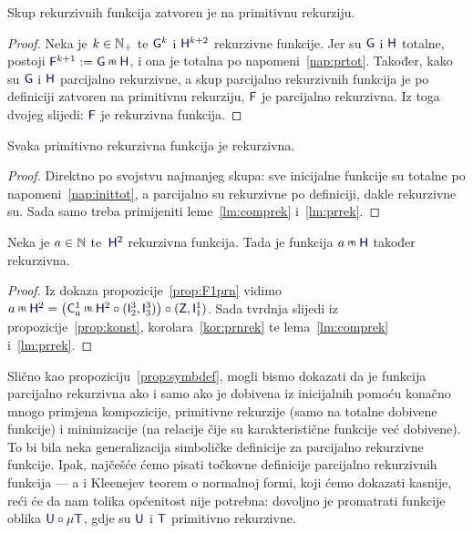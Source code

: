\begin{lema}[{name=[zatvorenost skupa rekurzivnih funkcija na primitivnu rekurziju]}]\label{lm:prrek}
Skup rekurzivnih funkcija zatvoren je na primitivnu rekurziju.
\end{lema}
\begin{proof}
    Neka je $k\in{\mathbb N}_+$ te $\f G^k$ i $\f H^{k+2}$ rekurzivne funkcije. Jer su $\f G$ i $\f H$ totalne, postoji $\f F^{k+1}:=\f G\pr\f H$, i ona je totalna po napomeni~\ref{nap:prtot}. Također, kako su $\f G$ i $\f H$ parcijalno rekurzivne, a skup parcijalno rekurzivnih funkcija je po definiciji zatvoren na primitivnu rekurziju, $\f F$ je parcijalno rekurzivna. Iz toga dvojeg slijedi: $\f F$ je rekurzivna funkcija.
\end{proof}

\begin{korolar}[{name=[rekurzivnost primitivno rekurzivnih funkcija]}]\label{kor:prnrek}
Svaka primitivno rekurzivna funkcija je rekurzivna.
\end{korolar}
\begin{proof}
Direktno po svojstvu najmanjeg skupa: sve inicijalne funkcije su totalne po napomeni~\ref{nap:inittot}, a parcijalno su rekurzivne po definiciji, dakle rekurzivne su. Sada samo treba primijeniti leme~\ref{lm:comprek} i~\ref{lm:prrek}.
\end{proof}

\begin{korolar}[{name=[degenerirana primitivna rekurzija iz rekurzivne funkcije]}]\label{kor:F1rek}
Neka je $a\in{\mathbb N}$ te\, $\f H^2$ rekurzivna funkcija. Tada je funkcija $a\pr\f H$ također rekurzivna.
\end{korolar}
\begin{proof}
Iz dokaza propozicije~\ref{prop:F1prn}
vidimo $a\pr\f H^2=\bigl(\f C_a^1\pr\f H^2\circ(\f I_2^3,\f I_3^3)\bigr)\circ(\f Z,\f I_1^1)$. Sada tvrdnja slijedi iz propozicije~\ref{prop:konst}, korolara~\ref{kor:prnrek} te lema~\ref{lm:comprek} i~\ref{lm:prrek}.
\end{proof}

Slično kao propoziciju~\ref{prop:symbdef}, mogli bismo dokazati da je funkcija parcijalno rekurzivna ako i samo ako je dobivena iz inicijalnih pomoću konačno mnogo primjena kompozicije, primitivne rekurzije (samo na totalne dobivene funkcije) i minimizacije (na relacije čije su karakteristične funkcije već dobivene). To bi bila neka generalizacija simboličke definicije za parcijalno rekurzivne funkcije. Ipak, najčešće ćemo pisati točkovne definicije parcijalno rekurzivnih funkcija --- a i Kleenejev teorem o normalnoj formi, koji ćemo dokazati kasnije, reći će da nam tolika općenitost nije potrebna: dovoljno je promatrati funkcije oblika $\f U\circ\mu\f T$, gdje su $\f U$ i $\f T$ primitivno rekurzivne.

